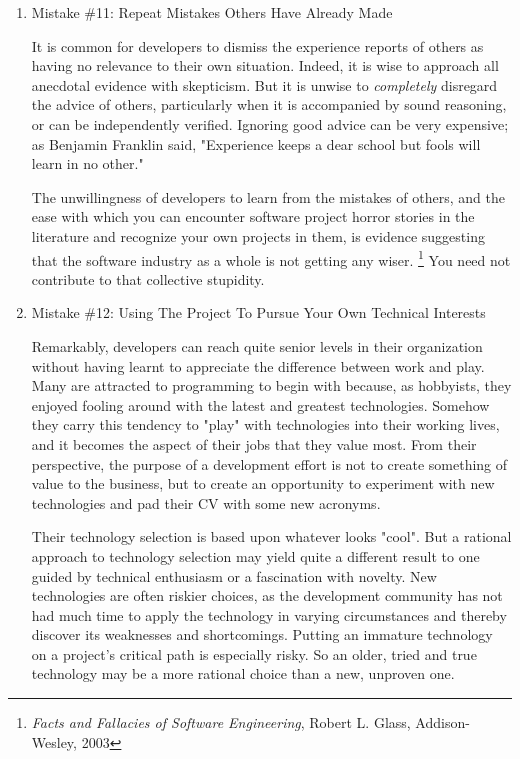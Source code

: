 \documentclass{article}
\begin{document}
\begin{enumerate}
\item Mistake \#11: Repeat Mistakes Others Have Already Made
\label{sec:orgheadline154}

It is common for developers to dismiss the experience reports of others
as having no relevance to their own situation. Indeed, it is wise to
approach all anecdotal evidence with skepticism. But it is unwise to
\emph{completely} disregard the advice of others, particularly when it is
accompanied by sound reasoning, or can be independently verified.
Ignoring good advice can be very expensive; as Benjamin Franklin said,
"Experience keeps a dear school but fools will learn in no other."

The unwillingness of developers to learn from the mistakes of others,
and the ease with which you can encounter software project horror
stories in the literature and recognize your own projects in them, is
evidence suggesting that the software industry as a whole is not getting
any wiser. \footnote{\emph{Facts and Fallacies of Software Engineering}, Robert L. Glass,
Addison-Wesley, 2003} You need not contribute to that collective stupidity.

\item Mistake \#12: Using The Project To Pursue Your Own Technical
\label{sec:orgheadline155}
Interests

Remarkably, developers can reach quite senior levels in their
organization without having learnt to appreciate the difference between
work and play. Many are attracted to programming to begin with because,
as hobbyists, they enjoyed fooling around with the latest and greatest
technologies. Somehow they carry this tendency to "play" with
technologies into their working lives, and it becomes the aspect of
their jobs that they value most. From their perspective, the purpose of
a development effort is not to create something of value to the
business, but to create an opportunity to experiment with new
technologies and pad their CV with some new acronyms.

Their technology selection is based upon whatever looks "cool". But a
rational approach to technology selection may yield quite a different
result to one guided by technical enthusiasm or a fascination with
novelty. New technologies are often riskier choices, as the development
community has not had much time to apply the technology in varying
circumstances and thereby discover its weaknesses and shortcomings.
Putting an immature technology on a project's critical path is
especially risky. So an older, tried and true technology may be a more
rational choice than a new, unproven one.


\end{enumerate}
\end{document}
